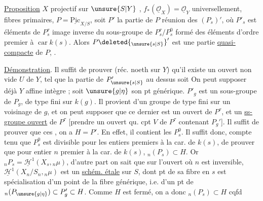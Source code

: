 \uline{Proposition} $X$ projectif sur $\unsure{S|Y}$ , $f_*(\underline{\mathcal O}_X)=\underline{\mathcal O}_Y$ universellement, fibres primaires, $P=\underline{\mathrm{Pic}}_{X/S}$, soit $P'$ la partie de $P$ réunion des $(P_s)'$, où $P'_s$ est  éléments de $P_s^\tau$ image inverse du sous-groupe de $P_s^\tau/P_s^0$ formé des éléments d'ordre premier à  $\operatorname{car} k(s)$.  Alors $P\deleted{_{\unsure{s|S}}}'$ est une partie   \uline{quasi-compacte} de $P$, .

\uline{Démonstration}. Il suffit de prouver (réc. noeth sur $Y$) qu'il existe un ouvert non vide $U$ de $Y$, tel que la partie de $P'_{\unsure{s|S}}$ au dessus soit  On peut supposer déjà $Y$ affine intègre ; soit $\unsure{g|\eta}$ son pt générique.  $P'_g$ est un sous-groupe  de $P_g$, de type fini sur $k(g)$. Il provient d'un groupe  de type fini sur un voisinage de $g$, et on peut supposer  que ce dernier est un ouvert de $P^\tau$, et  un \uline{ss-groupe ouvert} de $P^\tau$ [prendre un ouvert qu. cpt $V$ de $P^\tau$ contenant $P_g'$].
 Il suffit de prouver que  ces , on a $H=P'$. En effet, il  contient les $P_s^0$. Il suffit donc, compte tenu que $P_s^0$ est divisible pour les entiers premiers à la car. de $k(s)$, de prouver que  pour  entier $n$ premier à la car. de $k(s)$, $ {}_n(P_s)\subset H$. Or $ {}_nP_s=\underline{\mathscr H}^{1}(X_s,{}_n\mu)$, d'autre part on sait  que sur l'ouvert  où $n$ est inversible, $\underline{\mathscr H}^{1}(X_n/S_n,{}_n\mu)$ est un  \uline{schém. étale} sur $S$, dont  pt de sa fibre en $s$ est spécialisation d'un point de la fibre générique, i.e. d'un pt de $ {}_n(P_{\unsure{g|\eta}})\subset P'_g\subset H$. Comme $H$ est fermé, on a donc $ {}_n(P_s)\subset H$ cqfd

